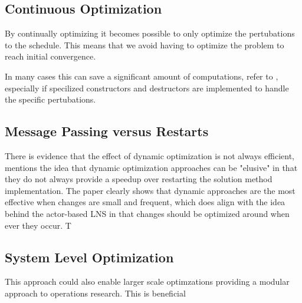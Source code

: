 \documentclass[preprint,12pt,authoryear]{elsarticle}
\begin{document}
\subsection{Continuous Optimization}
By continually optimizing it becomes possible to only optimize the pertubations to the schedule. This means that we avoid having to optimize the problem to reach initial convergence.

In many cases this can save a significant amount of computations, refer to \cite{alza_bartlett_ceberio_mccall_2023}, especially if specilized constructors and destructors are implemented to handle the specific pertubations.

\subsection{Message Passing versus Restarts}
There is evidence that the effect of dynamic optimization is not always efficient, \cite{alza_bartlett_ceberio_mccall_2023} mentions the idea that dynamic optimization approaches can be "elusive" in that they do not always provide a speedup over restarting the solution method implementation. 
The paper clearly shows that dynamic approaches are the most effective when changes are small and frequent, which does align with the idea behind the actor-based LNS in that changes should be optimized around when ever they occur. T   


\subsection{System Level Optimization}
This approach could also enable larger scale optimzations providing a modular approach to operations research. This is beneficial 



\end{document}
